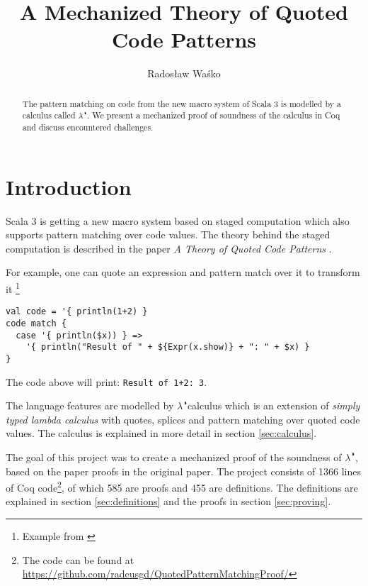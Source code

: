 \documentclass[runningheads]{article}
\newcommand{\calculus}{$\lambda^{\RIGHTcircle}$}
\begin{document}
\title{A Mechanized Theory of Quoted Code Patterns}
%
\author{Radosław Waśko}

%
%
%
\maketitle              %
\begin{abstract}
The pattern matching on code from the new macro system of Scala 3 is modelled by a calculus called \calculus. We present a mechanized proof of soundness of the calculus in Coq and discuss encountered challenges.
%
\end{abstract}
%
%
\section{Introduction}

Scala 3 is getting a new macro system based on staged computation \cite{dottydocMacro} which also supports pattern matching over code values. The theory behind the staged computation is described in the paper \textit{A Theory of Quoted Code Patterns} \cite{QPM}. 

For example, one can quote an expression and pattern match over it to transform it \footnote{Example from \cite{QPM}}

\begin{lstlisting}[style=myScalaStyle]
val code = '{ println(1+2) }
code match {
  case '{ println($x)) } =>
    '{ println("Result of " + ${Expr(x.show)} + ": " + $x) }
}
\end{lstlisting}

The code above will print: \texttt{Result of 1+2: 3}.

The language features are modelled by \calculus calculus which is an extension of \textit{simply typed lambda calculus} with quotes, splices and pattern matching over quoted code values. The calculus is explained in more detail in section \ref{sec:calculus}.

The goal of this project was to create a mechanized proof of the soundness of \calculus, based on the paper proofs in the original paper. The project consists of 1366 lines of Coq code\footnote{The code can be found at  \href{https://github.com/radeusgd/QuotedPatternMatchingProof/}{https://github.com/radeusgd/QuotedPatternMatchingProof/}}, of which 585 are proofs and 455 are definitions. The definitions are explained in section \ref{sec:definitions} and the proofs in section \ref{sec:proving}.
\end{document}
